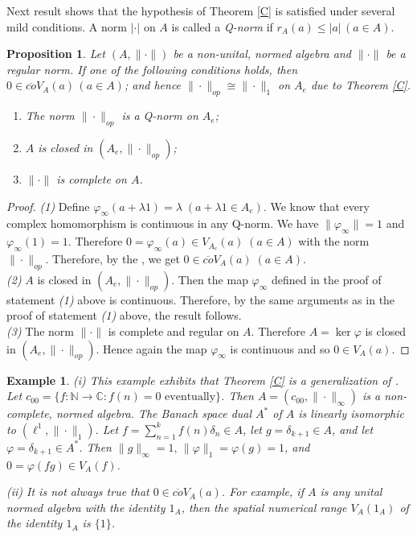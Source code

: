 \documentclass{amsart}
\theoremstyle{plain}
\newtheorem{prop}[defn]{Proposition}
\newtheorem{exam}[defn]{Example}
\numberwithin{equation}{section}
\begin{document}
Next result shows that the hypothesis of Theorem \ref{C} is satisfied under several mild conditions. A norm $|\cdot|$ on $A$ is called a \emph{Q-norm} if $r_A(a) \leq |a| \, (a \in A).$

\begin{prop}
Let $(A, \|\cdot\|)$ be a non-unital, normed algebra and $\|\cdot\|$ be a regular norm. If one of the following conditions holds, then $0 \in \overline{co}V_A(a) \, (a \in A)$; and hence $\|\cdot\|_{op} \cong \|\cdot\|_1$ on $A_e$ due to Theorem \ref{C}.
\begin{enumerate}
\item The norm $\|\cdot\|_{op}$ is a Q-norm on $A_e$;
\item $A$ is closed in $(A_e, \|\cdot\|_{op})$;
\item $\|\cdot\|$ is complete on $A$.
\end{enumerate}
\end{prop}

\begin{proof}
\emph{(1)} Define $\varphi_{\infty}(a + \lambda 1) = \lambda \; (a+ \lambda 1 \in A_e)$. We know that every complex homomorphism is continuous in any Q-norm. We have $\|\varphi_{\infty}\| = 1$ and $\varphi_{\infty}(1) = 1$. Therefore $0 = \varphi_{\infty}(a) \in V_{A_e}(a) \; (a \in A)$ with the norm $\|\cdot\|_{op}$. Therefore, by the \cite[Theorem 2.4(1)]{DePa:21}, we get $0 \in \overline{co}V_A(a) \; (a \in A)$.\\
\emph{(2)} $A$ is closed in $(A_e, \|\cdot\|_{op})$. Then the map $\varphi_{\infty}$ defined in the proof of statement \emph{(1)} above is continuous. Therefore, by the same arguments as in the proof of statement \emph{(1)} above, the result follows.\\
\emph{(3)} The norm $\|\cdot\|$ is complete and regular on $A$. Therefore $A = \ker \varphi$ is closed in $(A_e, \|\cdot\|_{op})$. Hence again the map $\varphi_{\infty}$ is continuous and so $0 \in V_A(a)$.
\end{proof}

\begin{exam}
(i) This example exhibits that Theorem \ref{C} is a generalization of \cite{GaKo:93}. Let $c_{00} = \{f: \mathbb N \longrightarrow \mathbb C: f(n) =0 \text{ eventually}\}$. Then $A = (c_{00}, \|\cdot\|_{\infty})$ is a non-complete, normed algebra. The Banach space dual $A^*$ of $A$ is linearly isomorphic to $(\ell^1, \|\cdot\|_1)$. Let $f = \sum_{n=1}^kf(n)\delta_n \in A$, let $g = \delta_{k+1} \in A$, and let $\varphi =\delta_{k+1} \in A^*$. Then $\|g\|_{\infty} = 1, \, \|\varphi\|_1 = \varphi(g) = 1$, and $0 = \varphi(fg) \in V_A(f)$.

(ii) It is not always true that $0 \in \overline{co} V_A(a)$. For example, if $A$ is any unital normed algebra with the identity $1_A$, then the spatial numerical range $V_A(1_A)$ of the identity $1_A$ is $\{1\}$.
\end{exam}
\end{document}
